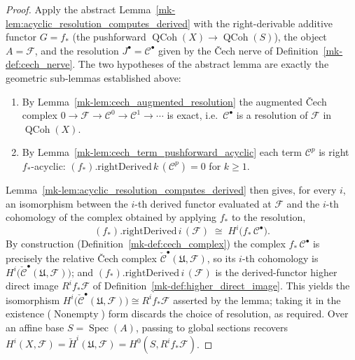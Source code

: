 \begin{proof}
  \leanok
  Apply the abstract Lemma~\ref{mk-lem:acyclic_resolution_computes_derived} with the
  right-derivable additive functor \(G = f_*\)
  (the pushforward \(\operatorname{QCoh}(X) \to \operatorname{QCoh}(S)\)), the object
  \(A = \mathcal{F}\), and the resolution \(J^\bullet = \mathcal{C}^\bullet\) given by
  the {\v C}ech nerve of Definition~\ref{mk-def:cech_nerve}. The two hypotheses of the
  abstract lemma are exactly the geometric sub-lemmas established above:
  \begin{enumerate}
    \item By Lemma~\ref{mk-lem:cech_augmented_resolution} the augmented {\v C}ech
      complex \(0 \to \mathcal{F} \to \mathcal{C}^0 \to \mathcal{C}^1 \to \cdots\) is
      exact, i.e.\ \(\mathcal{C}^\bullet\) is a resolution of \(\mathcal{F}\) in
      \(\operatorname{QCoh}(X)\).
    \item By Lemma~\ref{mk-lem:cech_term_pushforward_acyclic} each term
      \(\mathcal{C}^p\) is right \(f_*\)-acyclic:
      \((f_*).\mathrm{rightDerived}\,k\,(\mathcal{C}^p) = 0\) for \(k \geq 1\).
  \end{enumerate}
  Lemma~\ref{mk-lem:acyclic_resolution_computes_derived} then gives, for every \(i\), an
  isomorphism between the \(i\)-th derived functor evaluated at \(\mathcal{F}\) and
  the \(i\)-th cohomology of the complex obtained by applying \(f_*\) to the
  resolution,
  \[
    (f_*).\mathrm{rightDerived}\,i\,(\mathcal{F})
      \;\cong\;
    H^i\bigl(f_*\,\mathcal{C}^\bullet\bigr).
  \]
  By construction (Definition~\ref{mk-def:cech_complex}) the complex \(f_*\,
  \mathcal{C}^\bullet\) is precisely the relative {\v C}ech complex
  \(\check{\mathcal{C}}^\bullet(\mathfrak{U}, \mathcal{F})\), so its \(i\)-th
  cohomology is \(H^i\bigl(\check{\mathcal{C}}^\bullet(\mathfrak{U}, \mathcal{F})
  \bigr)\); and \((f_*).\mathrm{rightDerived}\,i\,(\mathcal{F})\) is the
  derived-functor higher direct image \(R^i f_*\mathcal{F}\) of
  Definition~\ref{mk-def:higher_direct_image}. This yields the isomorphism
  \(H^i\bigl(\check{\mathcal{C}}^\bullet(\mathfrak{U}, \mathcal{F})\bigr) \cong
  R^i f_*\mathcal{F}\) asserted by the lemma; taking it in the existence
  (\(\operatorname{Nonempty}\)) form discards the choice of resolution, as required.
  Over an affine base \(S = \operatorname{Spec}(A)\), passing to global sections
  recovers \(H^i(X, \mathcal{F}) = \check{H}^i(\mathfrak{U}, \mathcal{F}) = H^0(S,
  R^i f_*\mathcal{F})\).
\end{proof}

